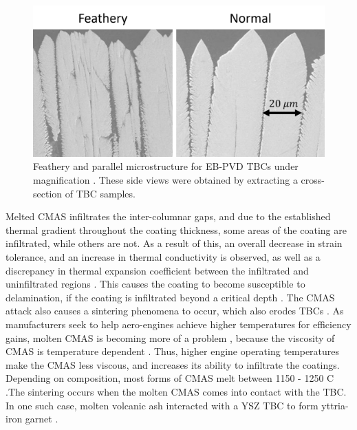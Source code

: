 \documentclass[%
 aip,
 amsmath,amssymb,
 reprint,%
floatfix]{revtex4-1}
\begin{document}
\begin{figure}
\includegraphics[width=.9\linewidth]{Figures/SEM.png}
\caption{Feathery and parallel microstructure for EB-PVD TBCs under magnification \cite{Naraparaju2017}. These side views were obtained by extracting a cross-section of TBC samples.}
\label{fig:TBC_scans}
\end{figure}

Melted CMAS infiltrates the inter-columnar gaps, and due to the established thermal gradient throughout the coating thickness, some areas of the coating are infiltrated, while others are not. As a result of this, an overall decrease in strain tolerance, and an increase in thermal conductivity is observed, as well as a discrepancy in thermal expansion coefficient between the infiltrated and uninfiltrated regions \cite{KAKUDA2015350,WU20111881, KRAMER200826}. This causes the coating to become susceptible to delamination, if the coating is infiltrated beyond a critical depth \cite{MERCER20051029}. The CMAS attack also causes a sintering phenomena to occur, which also erodes TBCs \cite{Peng2012}. As manufacturers seek to help aero-engines achieve higher temperatures for efficiency gains, molten CMAS is becoming more of a problem \cite{Boyce2012}, because the viscosity of CMAS is temperature dependent \cite{Naraparaju2017}. Thus, higher engine operating temperatures make the CMAS less viscous, and increases its ability to infiltrate the coatings. Depending on composition, most forms of CMAS melt between 1150 - 1250 \degree C \cite{Costa2019,Naraparaju2014,Wellman2010,Kramer2006}.The sintering occurs when the molten CMAS comes into contact with the TBC. In one such case, molten volcanic ash interacted with a YSZ TBC to form yttria-iron garnet \cite{Xia2019}.
\end{document}
